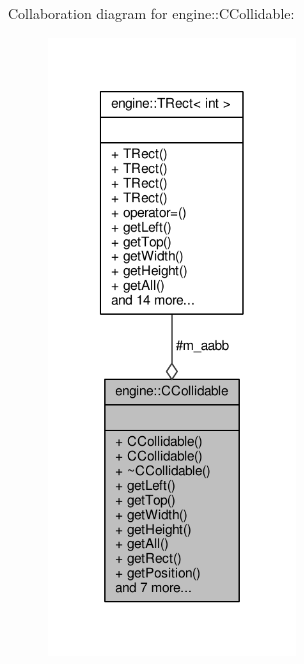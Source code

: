Collaboration diagram for engine\-:\-:C\-Collidable\-:\nopagebreak
\begin{figure}[H]
\begin{center}
\leavevmode
\includegraphics[width=186pt]{classengine_1_1CCollidable__coll__graph}
\end{center}
\end{figure}

